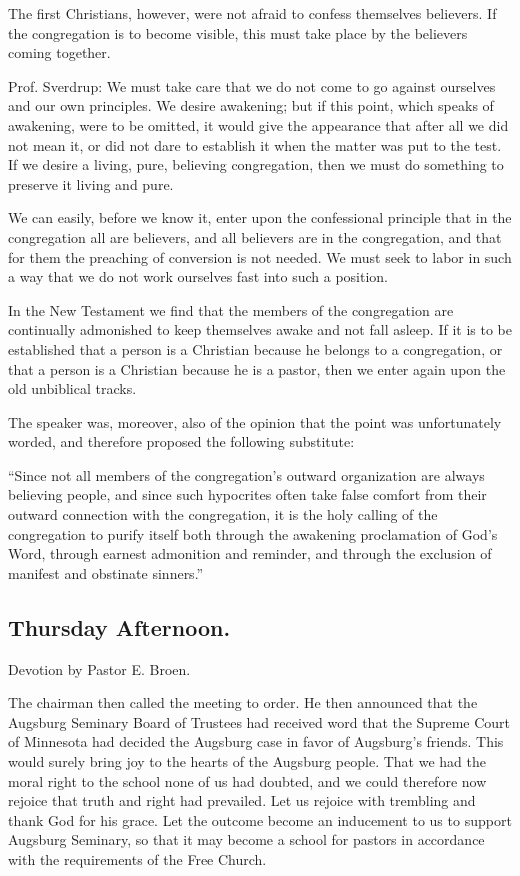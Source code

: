 The first Christians, however, were not afraid to confess themselves believers. If the congregation is to become visible, this must take place by the believers coming together.

Prof. Sverdrup: We must take care that we do not come to go against ourselves and our own principles. We desire awakening; but if this point, which speaks of awakening, were to be omitted, it would give the appearance that after all we did not mean it, or did not dare to establish it when the matter was put to the test. If we desire a living, pure, believing congregation, then we must do something to preserve it living and pure.

We can easily, before we know it, enter upon the confessional principle that in the congregation all are believers, and all believers are in the congregation, and that for them the preaching of conversion is not needed. We must seek to labor in such a way that we do not work ourselves fast into such a position.

In the New Testament we find that the members of the congregation are continually admonished to keep themselves awake and not fall asleep. If it is to be established that a person is a Christian because he belongs to a congregation, or that a person is a Christian because he is a pastor, then we enter again upon the old unbiblical tracks.

The speaker was, moreover, also of the opinion that the point was unfortunately worded, and therefore proposed the following substitute:

“Since not all members of the congregation’s outward organization are always believing people, and since such hypocrites often take false comfort from their outward connection with the congregation, it is the holy calling of the congregation to purify itself both through the awakening proclamation of God’s Word, through earnest admonition and reminder, and through the exclusion of manifest and obstinate sinners.”

\subsection{Thursday Afternoon.}

Devotion by Pastor E. Broen.

The chairman then called the meeting to order. He then announced that the Augsburg Seminary Board of Trustees had received word that the Supreme Court of Minnesota had decided the Augsburg case in favor of Augsburg’s friends. This would surely bring joy to the hearts of the Augsburg people. That we had the moral right to the school none of us had doubted, and we could therefore now rejoice that truth and right had prevailed. Let us rejoice with trembling and thank God for his grace. Let the outcome become an inducement to us to support Augsburg Seminary, so that it may become a school for pastors in accordance with the requirements of the Free Church.

